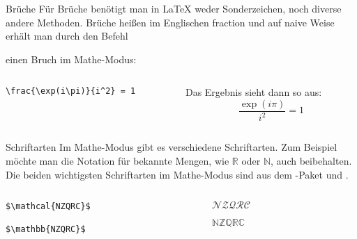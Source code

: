 \begin{frame}[fragile]{Brüche}
Für Brüche benötigt man in \LaTeX{} weder Sonderzeichen, noch diverse andere Methoden. Brüche heißen im Englischen \glqq fraction\grqq{} und auf naive Weise erhält man durch den Befehl
\begin{center}
\end{center}
einen Bruch im Mathe-Modus:
\begin{columns}
\begin{column}{0.55\textwidth}
\begin{codeblock}
\begin{verbatim}
\frac{\exp(i\pi)}{i^2} = 1
\end{verbatim}
\end{codeblock}
\end{column}
\begin{column}{0.35\textwidth}
Das Ergebnis sieht dann so aus:
\[
    \frac{\exp(i\pi)}{i^2} = 1
\]
\end{column}
\end{columns}
\end{frame}

\begin{frame}[fragile]{Schriftarten}
Im Mathe-Modus gibt es verschiedene Schriftarten. Zum Beispiel möchte man die Notation für bekannte Mengen, wie $\mathbb{R}$ oder $\mathbb{N}$, auch beibehalten. Die beiden wichtigsten Schriftarten im Mathe-Modus sind  aus dem -Paket und .
\begin{columns}
\begin{column}{0.55\textwidth}
\begin{codeblock}
\begin{verbatim}
$\mathcal{NZQRC}$

$\mathbb{NZQRC}$
\end{verbatim}
\end{codeblock}
\end{column}
\begin{column}{0.35\textwidth}
$\mathcal{NZQRC}$

\medskip
$\mathbb{NZQRC}$
\end{column}
\end{columns}
\end{frame}


